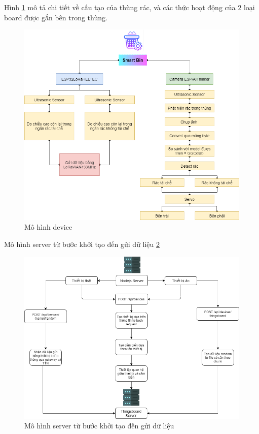 Hình \ref{fig:chart_smartbin} mô tả chi tiết về cấu tạo của thùng rác, và các thức hoạt động của 2 loại board được gắn bên trong thùng. 
\begin{figure}[H]
    \centering
    \includegraphics[width=\textwidth]{images/Chart_smartbin.png}
    \caption{Mô hình device}
    \label{fig:chart_smartbin}
\end{figure}


Mô hình server từ bước khởi tạo đến gửi dữ liệu \ref{fig:chart_server1}
\begin{figure}[H]
    \centering
    \includegraphics[width=\textwidth]{images/Khanh/Nodejs/Chart_server1.png}
    \caption{Mô hình server từ bước khởi tạo đến gửi dữ liệu}
    \label{fig:chart_server1}
\end{figure}


